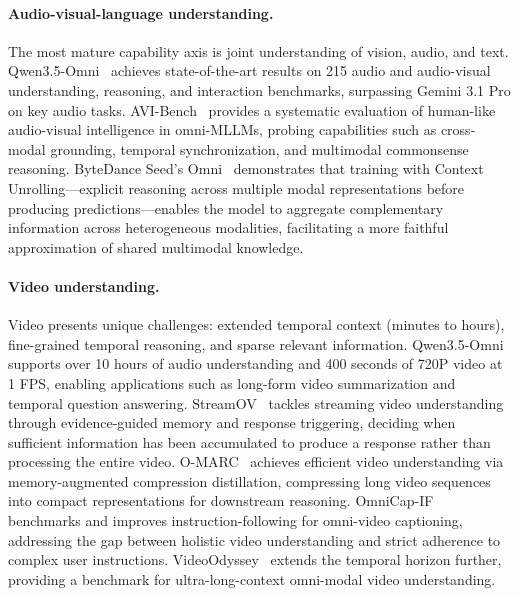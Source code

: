 \documentclass{article}
\begin{document}
\paragraph{Audio-visual-language understanding.}
The most mature capability axis is joint understanding of vision, audio, and text.
Qwen3.5-Omni~\cite{qwen2026omni} achieves state-of-the-art results on 215 audio and audio-visual understanding, reasoning, and interaction benchmarks, surpassing Gemini 3.1 Pro on key audio tasks.
AVI-Bench~\cite{placeholder2026avibench} provides a systematic evaluation of human-like audio-visual intelligence in omni-MLLMs, probing capabilities such as cross-modal grounding, temporal synchronization, and multimodal commonsense reasoning.
ByteDance Seed's Omni~\cite{seed2026omni} demonstrates that training with Context Unrolling---explicit reasoning across multiple modal representations before producing predictions---enables the model to aggregate complementary information across heterogeneous modalities, facilitating a more faithful approximation of shared multimodal knowledge.

\paragraph{Video understanding.}
Video presents unique challenges: extended temporal context (minutes to hours), fine-grained temporal reasoning, and sparse relevant information.
Qwen3.5-Omni~\cite{qwen2026omni} supports over 10 hours of audio understanding and 400 seconds of 720P video at 1 FPS, enabling applications such as long-form video summarization and temporal question answering.
StreamOV~\cite{placeholder2026streamov} tackles streaming video understanding through evidence-guided memory and response triggering, deciding when sufficient information has been accumulated to produce a response rather than processing the entire video.
O-MARC~\cite{placeholder2026omarc} achieves efficient video understanding via memory-augmented compression distillation, compressing long video sequences into compact representations for downstream reasoning.
OmniCap-IF~\cite{placeholder2026omnicapif} benchmarks and improves instruction-following for omni-video captioning, addressing the gap between holistic video understanding and strict adherence to complex user instructions.
VideoOdyssey~\cite{placeholder2026videoodyssey} extends the temporal horizon further, providing a benchmark for ultra-long-context omni-modal video understanding.
\end{document}
